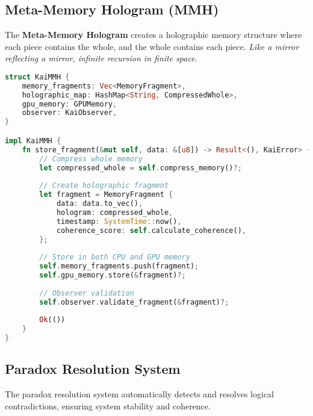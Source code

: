 \documentclass[11pt]{report}
\newcommand{\recursive}[1]{\textcolor{kai_purple}{\textbf{#1}}}
\newcommand{\codebox}[2]{
  \begin{tcolorbox}[
    colback=gray!5,
    colframe=kai_blue,
    title=#1,
    fonttitle=\bfseries
  ]
  #2
  \end{tcolorbox}
}
\newcommand{\paradoxbox}[2]{
  \begin{tcolorbox}[
    colback=red!5,
    colframe=kai_red,
    title=#1,
    fonttitle=\bfseries
  ]
  #2
  \end{tcolorbox}
}
\newcommand{\observerbox}[2]{
  \begin{tcolorbox}[
    colback=green!5,
    colframe=kai_green,
    title=#1,
    fonttitle=\bfseries
  ]
  #2
  \end{tcolorbox}
}
\begin{document}
\subsection{Meta-Memory Hologram (MMH)}
\observerbox{MMH - Holographic Memory System}{
The \recursive{Meta-Memory Hologram} creates a holographic memory structure where each piece contains the whole, and the whole contains each piece. \textit{Like a mirror reflecting a mirror, infinite recursion in finite space.}
}

\codebox{MMH Core Implementation}{
\begin{lstlisting}[language=rust]
struct KaiMMH {
    memory_fragments: Vec<MemoryFragment>,
    holographic_map: HashMap<String, CompressedWhole>,
    gpu_memory: GPUMemory,
    observer: KaiObserver,
}

impl KaiMMH {
    fn store_fragment(&mut self, data: &[u8]) -> Result<(), KaiError> {
        // Compress whole memory
        let compressed_whole = self.compress_memory()?;
        
        // Create holographic fragment
        let fragment = MemoryFragment {
            data: data.to_vec(),
            hologram: compressed_whole,
            timestamp: SystemTime::now(),
            coherence_score: self.calculate_coherence(),
        };
        
        // Store in both CPU and GPU memory
        self.memory_fragments.push(fragment);
        self.gpu_memory.store(&fragment)?;
        
        // Observer validation
        self.observer.validate_fragment(&fragment)?;
        
        Ok(())
    }
}
\end{lstlisting}
}

\subsection{Paradox Resolution System}
\paradoxbox{Paradox Resolution - Self-Healing Logic}{
The paradox resolution system automatically detects and resolves logical contradictions, ensuring system stability and coherence.
}
\end{document}
